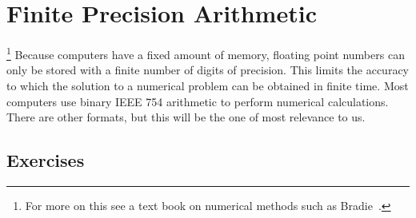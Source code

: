 \chapter{Finite Precision Arithmetic}

\footnote{For more on this see a text book on numerical methods such as Bradie~\cite{Bra06}.} Because computers have a fixed amount of memory, floating point numbers can only be stored with a finite number of digits of precision. This limits the accuracy to which the solution to a numerical problem can be obtained in finite time. Most computers use binary IEEE 754 arithmetic to perform numerical calculations. There are other formats, but this will be the one of most relevance to us.

\section{Exercises}
